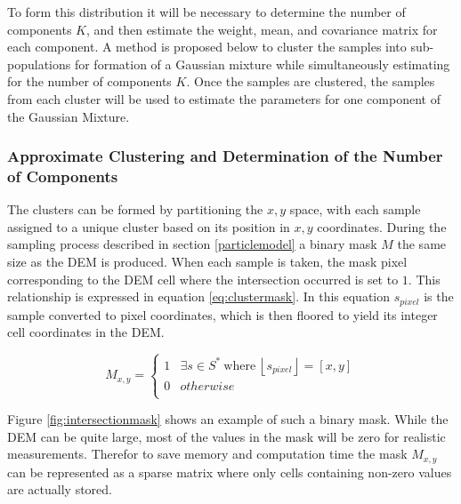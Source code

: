 \documentclass[journal]{IEEEtran}
\def\lf{\left\lfloor}
\def\rf{\right\rfloor}
\begin{document}
To form this distribution it will be necessary to determine the number of components $K$, and then estimate the weight, mean, and covariance matrix for each component. A method is proposed below to cluster the samples into sub-populations for formation of a Gaussian mixture while simultaneously estimating for the number of components $K$. Once the samples are clustered, the samples from each cluster will be used to estimate the parameters for one component of the Gaussian Mixture.

\subsubsection{Approximate Clustering and Determination of the Number of Components} \label{kclusters}
The clusters can be formed by partitioning the $x,y$ space, with each sample assigned to a unique cluster based on its position in $x,y$ coordinates. During the sampling process described in section \ref{particlemodel} a binary mask $M$ the same size as the DEM is produced. When each sample is taken, the mask pixel corresponding to the DEM cell where the intersection occurred is set to $1$. This relationship is expressed in equation \ref{eq:clustermask}. In this equation $s_{pixel}$ is the sample converted to pixel coordinates, which is then floored to yield its integer cell coordinates in the DEM.

\begin{dmath} \label{eq:clustermask}
    M_{x,y} = \begin{cases}
        1 & \exists s \in S^*\ \text{where}\ \lf s_{pixel} \rf = [x,y] \\
        0 & otherwise \\
    \end{cases}
\end{dmath}

Figure \ref{fig:intersectionmask} shows an example of such a binary mask. While the DEM can be quite large, most of the values in the mask will be zero for realistic measurements. Therefor to save memory and computation time the mask $M_{x,y}$ can be represented as a sparse matrix where only cells containing non-zero values are actually stored.
\end{document}
